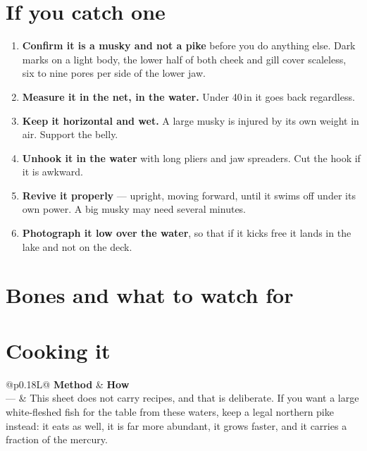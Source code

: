 \section{If you catch one}
\begin{enumerate}
\item \textbf{Confirm it is a musky and not a pike} before you do anything else. Dark marks on a light body, the lower half of both cheek and gill cover scaleless, six to nine pores per side of the lower jaw. 
\item \textbf{Measure it in the net, in the water.} Under 40\,in it goes back regardless.
\item \textbf{Keep it horizontal and wet.} A large musky is injured by its own weight in air. Support the belly.
\item \textbf{Unhook it in the water} with long pliers and jaw spreaders. Cut the hook if it is awkward.
\item \textbf{Revive it properly} --- upright, moving forward, until it swims off under its own power. A big musky may need several minutes.
\item \textbf{Photograph it low over the water}, so that if it kicks free it lands in the lake and not on the deck.
\end{enumerate}

\section{Bones and what to watch for}
\begin{telosfacts}[0.20]
\end{telosfacts}

\section{Cooking it}
\begin{tabularx}{\linewidth}{@{}p{0.18\linewidth}L@{}}
\toprule
\textbf{Method} & \textbf{How}\\
\midrule
--- & This sheet does not carry recipes, and that is deliberate. If you want a large white-fleshed fish for the table from these waters, keep a legal northern pike instead: it eats as well, it is far more abundant, it grows faster, and it carries a fraction of the mercury.\\
\bottomrule
\end{tabularx}

